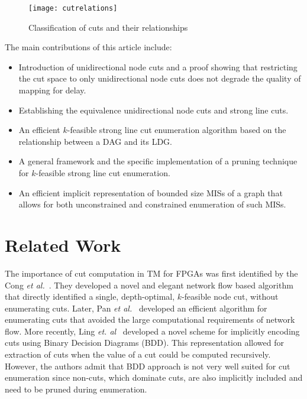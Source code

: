 \documentclass[journal]{IEEEtran}
\begin{document}
\begin{figure}[h]
\centering
\texttt{[image: cutrelations]}
\caption{Classification of cuts and their relationships}
\label{fig:cutrelations}
\end{figure}

The  main contributions of this article include:
\begin{itemize}
\item Introduction of unidirectional node cuts and a proof showing that restricting the cut space to only unidirectional node cuts does not degrade the quality of mapping for delay.
\item Establishing the equivalence unidirectional node cuts and strong line cuts.
\item An efficient $k$-feasible strong line cut enumeration algorithm based on the relationship between a DAG and its LDG. 
\item A general framework and the specific implementation of a pruning technique for $k$-feasible strong line cut enumeration.
\item An efficient implicit representation of bounded size MISs of a graph that allows for both unconstrained and constrained enumeration of such MISs.
\end{itemize}

\section{Related Work}
\label{sec:related-work}

The importance of cut computation in TM for FPGAs was first identified by the Cong \emph{et al.}~\cite{Cong1994}. They developed a novel and elegant network flow based algorithm that directly identified a single, depth-optimal, $k$-feasible node cut, without enumerating cuts.  Later, Pan \emph{et al.}~\cite{pan_lin,Pan1998} developed an efficient algorithm for enumerating cuts that avoided the large computational requirements of network flow.  More recently, Ling \emph{et. al}~\cite{Ling2007} developed a novel scheme for implicitly encoding cuts using Binary Decision Diagrams (BDD).  This representation allowed for extraction of cuts when the value of a cut could be computed recursively.  However, the authors admit that BDD approach is not very well suited for cut enumeration since non-cuts, which dominate cuts, are also implicitly included and need to be pruned during enumeration.
\end{document}
